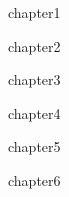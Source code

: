\documentclass[12pt, a4paper, reqno, oneside]{book}
\begin{document}

\newpage


\pagestyle{plain}
\newpage


\tableofcontents
\newpage


\newpage
 {chapter1}

\newpage
 {chapter2}

\newpage
 {chapter3}

\newpage
 {chapter4}

\newpage
 {chapter5}

\newpage
 {chapter6}
\end{document}
